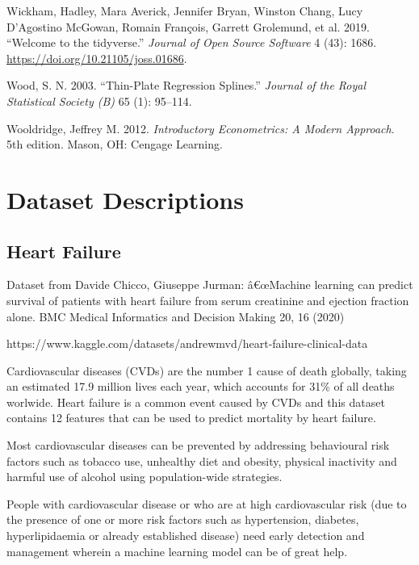 \documentclass[
  letterpaper,
]{krantz}
\newlength{\cslhangindent}
\newlength{\cslentryspacingunit} %
\newenvironment{CSLReferences}[2] %
 {%
  \setlength{\parindent}{0pt}
  \ifodd #1
  \let\oldpar\par
  \def\par{\hangindent=\cslhangindent\oldpar}
  \fi
  \setlength{\parskip}{#2\cslentryspacingunit}
 }%
 {}
\begin{document}
\begin{CSLReferences}{1}{0}
\leavevmode{}%
Wickham, Hadley, Mara Averick, Jennifer Bryan, Winston Chang, Lucy
D'Agostino McGowan, Romain François, Garrett Grolemund, et al. 2019.
{``Welcome to the {tidyverse}.''} \emph{Journal of Open Source Software}
4 (43): 1686. \url{https://doi.org/10.21105/joss.01686}.

\leavevmode{}%
Wood, S. N. 2003. {``Thin-Plate Regression Splines.''} \emph{Journal of
the Royal Statistical Society (B)} 65 (1): 95--114.

\leavevmode{}%
Wooldridge, Jeffrey M. 2012. \emph{Introductory {Econometrics}: {A}
{Modern} {Approach}}. 5th edition. Mason, OH: Cengage Learning.

\end{CSLReferences}

\chapter{Dataset Descriptions}\label{sec-data-descript}

\section{Heart Failure}\label{sec-dd-hear-failure}

Dataset from Davide Chicco, Giuseppe Jurman: â€œMachine learning can
predict survival of patients with heart failure from serum creatinine
and ejection fraction alone. BMC Medical Informatics and Decision Making
20, 16 (2020)

https://www.kaggle.com/datasets/andrewmvd/heart-failure-clinical-data

Cardiovascular diseases (CVDs) are the number 1 cause of death globally,
taking an estimated 17.9 million lives each year, which accounts for
31\% of all deaths worlwide. Heart failure is a common event caused by
CVDs and this dataset contains 12 features that can be used to predict
mortality by heart failure.

Most cardiovascular diseases can be prevented by addressing behavioural
risk factors such as tobacco use, unhealthy diet and obesity, physical
inactivity and harmful use of alcohol using population-wide strategies.

People with cardiovascular disease or who are at high cardiovascular
risk (due to the presence of one or more risk factors such as
hypertension, diabetes, hyperlipidaemia or already established disease)
need early detection and management wherein a machine learning model can
be of great help.
\end{document}
